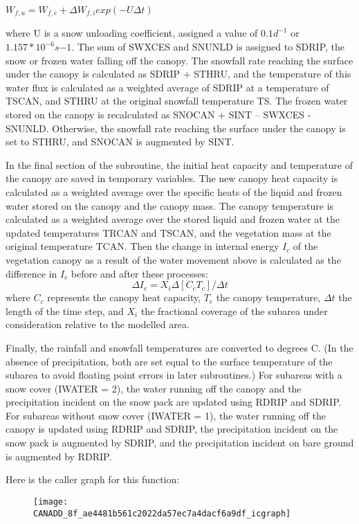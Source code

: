 $W_{f,u} = {W_{f,c} + \Delta W_{f,i} } exp (-U \Delta t)$

where U is a snow unloading coefficient, assigned a value of $0.1 d^{-1}$ or $1.157 * 10^{-6} s{-1}$. The sum of S\+W\+X\+C\+E\+S and S\+N\+U\+N\+L\+D is assigned to S\+D\+R\+I\+P, the snow or frozen water falling off the canopy. The snowfall rate reaching the surface under the canopy is calculated as S\+D\+R\+I\+P + S\+T\+H\+R\+U, and the temperature of this water flux is calculated as a weighted average of S\+D\+R\+I\+P at a temperature of T\+S\+C\+A\+N, and S\+T\+H\+R\+U at the original snowfall temperature T\+S. The frozen water stored on the canopy is recalculated as S\+N\+O\+C\+A\+N + S\+I\+N\+T – S\+W\+X\+C\+E\+S -\/ S\+N\+U\+N\+L\+D. Otherwise, the snowfall rate reaching the surface under the canopy is set to S\+T\+H\+R\+U, and S\+N\+O\+C\+A\+N is augmented by S\+I\+N\+T.

In the final section of the subroutine, the initial heat capacity and temperature of the canopy are saved in temporary variables. The new canopy heat capacity is calculated as a weighted average over the specific heats of the liquid and frozen water stored on the canopy and the canopy mass. The canopy temperature is calculated as a weighted average over the stored liquid and frozen water at the updated temperatures T\+R\+C\+A\+N and T\+S\+C\+A\+N, and the vegetation mass at the original temperature T\+C\+A\+N. Then the change in internal energy $I_c$ of the vegetation canopy as a result of the water movement above is calculated as the difference in $I_c$ before and after these processes\+: \[ \Delta I_c = X_i \Delta [C_c T_c ] / \Delta t \] where $C_c$ represents the canopy heat capacity, $T_c$ the canopy temperature, $\Delta t$ the length of the time step, and $X_i$ the fractional coverage of the subarea under consideration relative to the modelled area.

Finally, the rainfall and snowfall temperatures are converted to degrees C. (In the absence of precipitation, both are set equal to the surface temperature of the subarea to avoid floating point errors in later subroutines.) For subareas with a snow cover (I\+W\+A\+T\+E\+R = 2), the water running off the canopy and the precipitation incident on the snow pack are updated using R\+D\+R\+I\+P and S\+D\+R\+I\+P. For subareas without snow cover (I\+W\+A\+T\+E\+R = 1), the water running off the canopy is updated using R\+D\+R\+I\+P and S\+D\+R\+I\+P, the precipitation incident on the snow pack is augmented by S\+D\+R\+I\+P, and the precipitation incident on bare ground is augmented by R\+D\+R\+I\+P.

Here is the caller graph for this function\+:\nopagebreak
\begin{figure}[H]
\begin{center}
\leavevmode
\texttt{[image: CANADD\_8f\_ae4481b561c2022da57ec7a4dacf6a9df\_icgraph]}
\end{center}
\end{figure}


